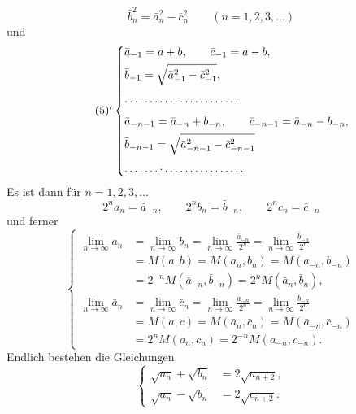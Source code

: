 \clearpage
\fancyhead{}
\begin{equation*}\tag*{(8)}\bar b_n^2=\bar a_n^2-\bar c_n^2\qquad(n=1,2,3,\ldots)\end{equation*}
\noindent und
\begin{equation*}\tag*{$(5)'$}
\left\{\begin{aligned}
&\bar a_{-1}=a+b,\qquad\bar c_{-1}=a-b,\\
&\bar b_{-1}=\sqrt{\bar a_{-1}^2-\bar c_{-1}^2},\\[3pt]
&.\,.\,.\,.\,.\,.\,.\,.\,.\,.\,.\,.\,.\,.\,.\,.\,.\,.\,.\,.\,.\,.\,.\\[3pt]
&\bar a_{-n-1}=\bar a_{-n}+\bar b_{-n},\qquad\bar c_{-n-1}=\bar a_{-n}-\bar b_{-n},\\
&\bar b_{-n-1}=\sqrt{\bar a_{-n-1}^2-\bar c_{-n-1}^2}\\[3pt]
&.\,.\,.\,.\,.\,.\,.\,\raisebox{.4ex}{.}\,.\,.\,.\,.\,.\,.\,.\,.\,.\,.\,.\,.\,.\,.\,.\,.
\end{aligned}\right.
\end{equation*}
\noindent Es ist dann für $n=1,2,3,\ldots$
\begin{equation*}\tag*{(8a)}2^na_n=\bar a_{-n},\qquad2^nb_n=\bar b_{-n},\qquad2^nc_n=\bar c_{-n}\end{equation*}
\noindent und ferner
\begin{equation*}\tag*{(9)}
\left\{\begin{aligned}
\lim_{n\to\infty}a_n&=\lim_{n\to\infty}b_n=\lim_{n\to\infty}\frac{\bar a_{-n}}{2^n}=\lim_{n\to\infty}\frac{\bar b_{-n}}{2^n}\\
&=M(a,b)=M(a_n,b_n)=M(a_{-n},b_{-n})\\
&=2^{-n}M(\bar a_{-n},\bar b_{-n})=2^nM(\bar a_n,\bar b_n),\\[6pt]
\lim_{n\to\infty}\bar a_n&=\lim_{n\to\infty}\bar c_n=\lim_{n\to\infty}\frac{a_{-n}}{2^n}=\lim_{n\to\infty}\frac{b_{-n}}{2^n}\\
&=M(a,c)=M(\bar a_n,\bar c_n)=M(\bar a_{-n},\bar c_{-n})\\
&=2^nM(a_n,c_n)=2^{-n}M(a_{-n},c_{-n}).
\end{aligned}\right.
\end{equation*}
\noindent Endlich bestehen die Gleichungen
\begin{equation*}\tag*{(10)}
\left\{\begin{aligned}
\sqrt{a_n}+\sqrt{b_n}&=2\sqrt{a_{n+2}},\\
\sqrt{a_n}-\sqrt{b_n}&=2\sqrt{c_{n+2}}.
\end{aligned}\right.
\end{equation*}

